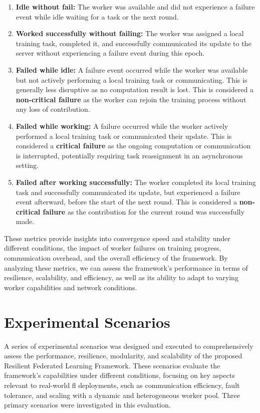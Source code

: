 \begin{enumerate}[label=\roman*)]
    \item \textbf{Idle without fail:} The worker was available and did not experience a failure event while idle waiting for a task or the next round.
    \item \textbf{Worked successfully without failing:} The worker was assigned a local training task, completed it, and successfully communicated its update to the server without experiencing a failure event during this epoch.
    \item \textbf{Failed while idle:} A failure event occurred while the worker was available but not actively performing a local training task or communicating. This is generally less disruptive as no computation result is lost. This is considered a \textbf{non-critical failure} as the worker can rejoin the training process without any loss of contribution.
    \item \textbf{Failed while working:} A failure occurred while the worker actively performed a local training task or communicated their update. This is considered a \textbf{critical failure} as the ongoing computation or communication is interrupted, potentially requiring task reassignment in an asynchronous setting.
    \item \textbf{Failed after working successfully:} The worker completed its local training task and successfully communicated its update, but experienced a failure event afterward, before the start of the next round. This is considered a \textbf{non-critical failure} as the contribution for the current round was successfully made.
\end{enumerate}

These metrics provide insights into convergence speed and stability under different conditions, the impact of worker failures on training progress, communication overhead, and the overall efficiency of the framework. By analyzing these metrics, we can assess the framework's performance in terms of resilience, scalability, and efficiency, as well as its ability to adapt to varying worker capabilities and network conditions.



\section{Experimental Scenarios}
\label{sec:experimental-scenarios}

A series of experimental scenarios was designed and executed to comprehensively assess the performance, resilience, modularity, and scalability of the proposed Resilient Federated Learning Framework. These scenarios evaluate the framework's capabilities under different conditions, focusing on key aspects relevant to real-world \ac{fl} deployments, such as communication efficiency, fault tolerance, and scaling with a dynamic and heterogeneous worker pool. Three primary scenarios were investigated in this evaluation.

